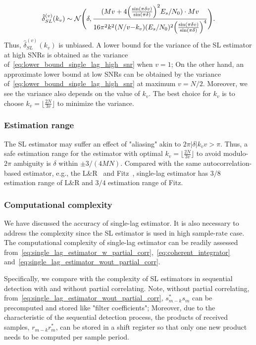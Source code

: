 \begin{equation}
  \label{eq:lower_bound_single_lag_high_snr}
  \hat{\delta}_{SL}^{(v)}(k_v) \sim \mathcal{N} \Bigg(\delta,\frac{(Mv+4\Big(\frac{\sin(\pi \delta v)}{\sin(\pi \delta)}\Big)^2E_s/N_0)\cdot Mv}{16\pi^2k^2(N/v{-}k_v)(E_s/N_0)^2\Big(\frac{\sin(\pi \delta v)}{\sin(\pi \delta)}\Big)^4}\Bigg).
\end{equation}
Thus, $\hat{\delta}_{SL}^{(v)}(k_v)$ is unbiased. 
A lower bound for the variance of the SL estimator at high SNRs is obtained
as the variance of~\eqref{eq:lower_bound_single_lag_high_snr} when $v=1$;
On the other hand, an approximate lower bound at low SNRs can be obtained by the variance of~\eqref{eq:lower_bound_single_lag_high_snr}
at maximum $v=N/2$.
Moreover, we see the variance also depends on
the value of $k_v$. The best choice for $k_v$ is to choose 
$k_v=\lfloor\frac{2N}{3v}\rfloor$ to minimize the variance.

\subsubsection{Estimation range}
The SL estimator may suffer an effect
of "aliasing" akin to $2\pi |\delta|k_vv{>}\pi$. Thus, a safe estimation range for the estimator with optimal $k_v=\lfloor\frac{2N}{3v}\rfloor$ to avoid modulo-$2\pi$ ambiguity
is $\delta$ within $\pm 3/(4MN)$. Compared with the same autocorrelation-based estimator, e.g.,
the L\&R~\cite{Luise_Reggiannini_95} and Fitz~\cite{Fitz_94}, single-lag estimator has 
$3/8$ estimation range of L\&R and $3/4$ estimation range of Fitz.

\subsubsection{Computational complexity}

We have discussed the accuracy of single-lag estimator.
It is also necessary to address the complexity since the SL estimator
is used in high sample-rate case. The computational complexity of single-lag estimator 
can be readily assessed from~\eqref{eq:single_lag_estimator_w_partial_corr},~\eqref{eq:coherent_integrator} and~\eqref{eq:single_lag_estimator_wout_partial_corr}.

Specifically, we compare with the complexity of SL estimators in sequential detection with and without partial correlating.
Note, without partial correlating, from~\eqref{eq:single_lag_estimator_wout_partial_corr},
$s_{m-k}^*s_m$ can be precomputed and stored
like "filter coefficients"; Moreover, due to the characteristic of the sequential detection process, the products of received samples, $r_{m-k}r_m^*$,
can be stored in a shift register so that only one new product needs to be computed per sample period.

